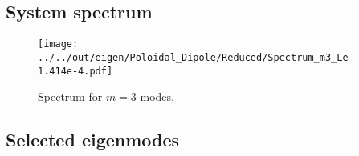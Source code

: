 \subsection{System spectrum}

\begin{figure}[htbp]
    \centering
    \texttt{[image: ../../out/eigen/Poloidal\_Dipole/Reduced/Spectrum\_m3\_Le-1.414e-4.pdf]}
    \caption{Spectrum for $m=3$ modes.}
\end{figure}

\subsection{Selected eigenmodes}

\clearpage
